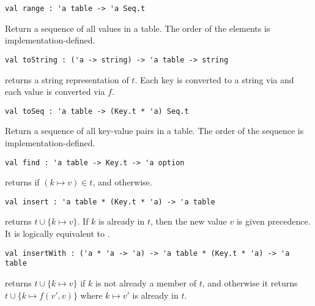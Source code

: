 \begin{gram}[range]
\begin{verbatim}
val range : 'a table -> 'a Seq.t
\end{verbatim}
Return a sequence of all values in a table. The order of the elements is
implementation-defined.
\end{gram}

\begin{gram}[toString]
\begin{verbatim}
val toString : ('a -> string) -> 'a table -> string
\end{verbatim}
 returns a string representation of $t$. Each key is converted
to a string via  and each value is converted via $f$.
\end{gram}

\begin{gram}[toSeq]
\begin{verbatim}
val toSeq : 'a table -> (Key.t * 'a) Seq.t
\end{verbatim}
Return a sequence of all key-value pairs in a table. The order of the sequence
is implementation-defined.
\end{gram}

\begin{gram}[find]
\begin{verbatim}
val find : 'a table -> Key.t -> 'a option
\end{verbatim}
 returns  if $(k \mapsto v) \in t$, and 
otherwise.
\end{gram}

\begin{gram}[insert]
\begin{verbatim}
val insert : 'a table * (Key.t * 'a) -> 'a table
\end{verbatim}
 returns $t \cup \{k \mapsto v\}$. If $k$ is already
in $t$, then the new value $v$ is given precedence. It is logically equivalent
to .
\end{gram}

\begin{gram}[insertWith]
\begin{verbatim}
val insertWith : ('a * 'a -> 'a) -> 'a table * (Key.t * 'a) -> 'a table
\end{verbatim}
 returns $t \cup \{k \mapsto v\}$ if $k$ is not
already a member of $t$, and otherwise it returns $t \cup \{k \mapsto f(v',v)\}$
where $k \mapsto v'$ is already in $t$.
\end{gram}

